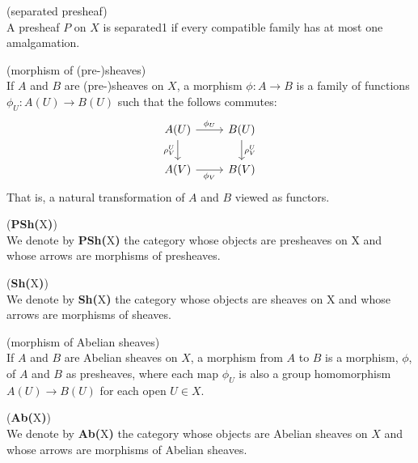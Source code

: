 \begin{definition*}
	(separated presheaf)\\
		A presheaf $P$ on $X$ is separated1 if every compatible family has at most one amalgamation.
\end{definition*}

\begin{definition*}
	(morphism of (pre-)sheaves) \\ If $A$ and $B$ are (pre-)sheaves on $X$, a morphism $\phi:A \rightarrow B$ is a family of functions $\phi_U: A(U) \rightarrow B(U)$ such that the follows commutes:
	\[
	\begin{tikzcd}
	A(U) \arrow[r, "\phi_U"] \arrow[d, "\rho^U_V"']
	& B(U) \arrow[d, "\rho^U_V"] \\
	A(V) \arrow[r, "\phi_V"']
	& B(V)
	\end{tikzcd}
	\]
	That is, a natural transformation of $A$ and $B$ viewed as functors.
\end{definition*}

\begin{definition*}
	(\textbf{PSh(}X\textbf{)}) \\ We denote by \textbf{PSh(}X\textbf{)} the category whose objects are presheaves on X and whose arrows are morphisms of presheaves.
\end{definition*}

\begin{definition*}
	(\textbf{Sh(}X\textbf{)})\\ We denote by \textbf{Sh(}X\textbf{)} the category whose objects are sheaves on X and whose arrows are morphisms of sheaves.
\end{definition*}

\begin{definition*}
	(morphism of Abelian sheaves)\\
	If $A$ and $B$ are Abelian sheaves on $X$, a morphism from $A$ to $B$ is a morphism, $\phi$, of $A$ and $B$ as presheaves, where each map $\phi_U$ is also a group homomorphism $A(U) \rightarrow B(U)$ for each open $U \in X$. 
\end{definition*}

\begin{definition*}
	(\textbf{Ab(}X\textbf{)}) \\ We denote by \textbf{Ab(}X\textbf{)} the category whose objects are Abelian sheaves on $X$ and whose arrows are morphisms of Abelian sheaves. 
\end{definition*}

